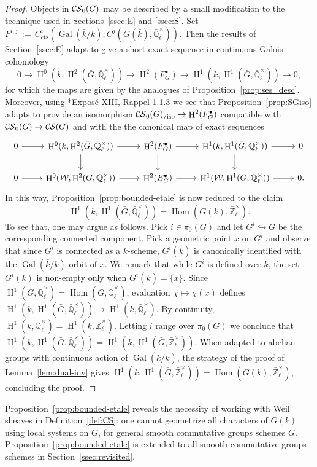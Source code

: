 \documentclass[10pt]{amsart}
\theoremstyle{plain}
\theoremstyle{definition}
\newcommand{\EE}{\mathbb{\bar Q}_\ell}
\newcommand{\bFq}{\bar{k}}
\newcommand{\Fq}{k}
\newcommand{\EEx}{\EE^\times}
\newcommand{\ZEx}{\mathbb{\bar Z}_\ell^\times}
\newcommand{\Weil}[1]{\mathcal{W}_{#1}}
\DeclareMathOperator{\Gal}{Gal}
\DeclareMathOperator{\Hom}{Hom}
\DeclareMathOperator{\Hh}{H}
\newcommand{\ceq}{{\, :=\, }}
\newcommand{\CS}{{\mathcal{C\hskip-0.8pt S}}}
\newcommand{\bCS}{{\CS_0}}
\newcommand{\bCSiso}[1]{\bCS(#1)_{/\text{iso}}}
\newcommand{\bG}{\bar{G}}
\begin{document}
\begin{proof}
Objects in $\bCS(G)$ may be described by a small modification to the technique used in Sections~\ref{ssec:E} and \ref{ssec:S}. 
Set $F^{i,j} \ceq C^i_{\text{cts}} (\Gal(\bFq/\Fq), C^j(G(\bFq), \EEx))$.
Then the results of Section~\ref{ssec:E} adapt to give a short exact sequence in continuous Galois cohomology
 \[
    0 \to
    \Hh^0(\Fq,\Hh^2(\bG,\EEx)) \to
    \Hh^2(F^\bullet_G) \to
    \Hh^1(\Fq,\Hh^1(\bG,\EEx)) \to
    0,
 \]
for which the maps are given by the analogues of Proposition~\ref{prop:ses_desc}.
Moreover, using \cite{deligne-katz:SGA7.2}*{Expos\'e XIII, Rappel 1.1.3} we see that Proposition~\ref{prop:SGiso}
adapts to provide an isomorphism $\bCSiso{G}\to \Hh^2(F^\bullet_G)$ compatible with $\bCS(G) \to \CS(G)$ and with the
the canonical map of exact sequences 
 \[
\begin{tikzcd}
    0 \arrow{r} &
    \Hh^0(\Fq,\Hh^2(\bG,\EEx)) \arrow{r} \arrow{d} &
    \Hh^2(F^\bullet_G) \arrow{r} \arrow{d} &
    \Hh^1(\Fq,\Hh^1(\bG,\EEx)) \arrow{r} \arrow{d} &
    0
\\
    0 \arrow{r} & 
    \Hh^0(\Weil{},\Hh^2(\bG,\EEx)) \arrow{r} & 
    \Hh^2(E^\bullet_G) \arrow{r} & 
    \Hh^1(\Weil{},\Hh^1(\bG,\EEx)) \arrow{r} &
    0.
\end{tikzcd}
 \]
In this way, Proposition~\ref{prop:bounded-etale} is now reduced to the claim
\[
\Hh^1(\Fq,\Hh^1(\bG,\EEx)) = \Hom(G(\Fq),\ZEx).
\]
To see that, one may argue as follows. 
Pick $i\in \pi_0(G)$ and let $G^i \hookrightarrow G$ be the corresponding connected component. 
Pick a geometric point $x$ on $G^i$ and observe that since $G^i$ is connected as a $\Fq$-scheme,
$G^i(\bFq)$ is canonically identified with the $\Gal(\bFq/\Fq)$-orbit of $x$. 
We remark that while $G^i$ is defined over $\Fq$, the set $G^i(\Fq)$ is non-empty only when $G^i(\bFq) = \{ x\}$.
Since $\Hh^1(\bG,\EEx) = \Hom(\bG,\EEx)$, evaluation $\chi \mapsto \chi(x)$ defines $\Hh^1(\Fq,\Hh^1(\bG,\EEx)) \to \Hh^1(\Fq,\EEx)$. 
By continuity, $\Hh^1(\Fq,\EEx) = \Hh^1(\Fq,\ZEx)$.
Letting $i$ range over $\pi_0(G)$ we conclude that $\Hh^1(\Fq,\Hh^1(\bG,\EEx)) = \Hh^1(\Fq,\Hh^1(\bG,\ZEx))$.
When adapted to abelian groups with continuous action of $\Gal(\bFq/\Fq)$, the strategy of the proof of
Lemma~\ref{lem:dual-inv} gives $\Hh^1(\Fq,\Hh^1(\bG,\ZEx)) =  \Hom(G(\Fq),\ZEx)$, concluding the proof.
\end{proof}

Proposition~\ref{prop:bounded-etale} reveals the necessity of working with Weil sheaves in Definition~\ref{def:CS}:
one cannot geometrize all characters of $G(\Fq)$ using local systems on $G$, for general smooth commutative groups schemes $G$.
Proposition~\ref{prop:bounded-etale} is extended to all smooth commutative groups schemes in Section~\ref{ssec:revisited}.
\end{document}
